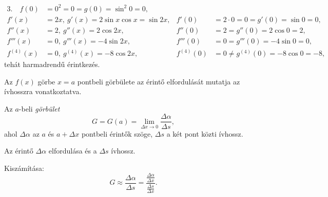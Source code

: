 \documentclass[11pt]{article}
\begin{document}
\begin{solution}
\begin{align*}
3.\quad f(0)&=0^{2}=0=g(0)=\sin^{2}0=0,\\
f'(x)&=2x,\ g'(x)=2\sin x\cos x=\sin 2x, & f'(0)&=2\cdot 0=0=g'(0)=\sin 0=0,\\
f''(x)&=2,\ g''(x)=2\cos 2x, & f''(0)&=2=g''(0)=2\cos 0=2,\\
f'''(x)&=0,\ g'''(x)=-4\sin 2x, & f'''(0)&=0=g'''(0)=-4\sin 0=0,\\
f^{(4)}(x)&=0,\ g^{(4)}(x)=-8\cos 2x, & f^{(4)}(0)&=0\neq g^{(4)}(0)=-8\cos 0=-8,
\end{align*}
tehát harmadrendű érintkezés.
\end{solution}

\noindent Az $f(x)$ görbe $x=a$ pontbeli görbülete az érintő elfordulását mutatja az ívhosszra vonatkoztatva.

\begin{defbox}
\begin{definition}[Görbület]
Az $a$-beli \emph{görbület}
\[
G=G(a)=\lim_{\Delta x\to 0}\frac{\Delta\alpha}{\Delta s},
\]
ahol $\Delta\alpha$ az $a$ és $a+\Delta x$ pontbeli érintők szöge, $\Delta s$ a két pont közti ívhossz.
\end{definition}
\end{defbox}

\begin{notefig}{Az érintő $\Delta\alpha$ elfordulása és a $\Delta s$ ívhossz.}
\end{notefig}

\noindent Kiszámítása:
\[
G\approx\frac{\Delta\alpha}{\Delta s}=\frac{\frac{\Delta\alpha}{\Delta x}}{\frac{\Delta s}{\Delta x}}.
\]
\end{document}
